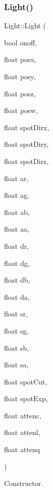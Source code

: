\subsubsection{\texorpdfstring{Light()}{Light()}\hspace{0.1cm}{\footnotesize\ttfamily [2/2]}}
{\footnotesize\ttfamily Light\+::\+Light (\begin{DoxyParamCaption}\item[{bool}]{onoff,  }\item[{float}]{posx,  }\item[{float}]{posy,  }\item[{float}]{posz,  }\item[{float}]{posw,  }\item[{float}]{spot\+Dirx,  }\item[{float}]{spot\+Diry,  }\item[{float}]{spot\+Dirz,  }\item[{float}]{ar,  }\item[{float}]{ag,  }\item[{float}]{ab,  }\item[{float}]{aa,  }\item[{float}]{dr,  }\item[{float}]{dg,  }\item[{float}]{db,  }\item[{float}]{da,  }\item[{float}]{sr,  }\item[{float}]{sg,  }\item[{float}]{sb,  }\item[{float}]{sa,  }\item[{float}]{spot\+Cut,  }\item[{float}]{spot\+Exp,  }\item[{float}]{attenc,  }\item[{float}]{attenl,  }\item[{float}]{attenq }\end{DoxyParamCaption})}



Constructor. 


